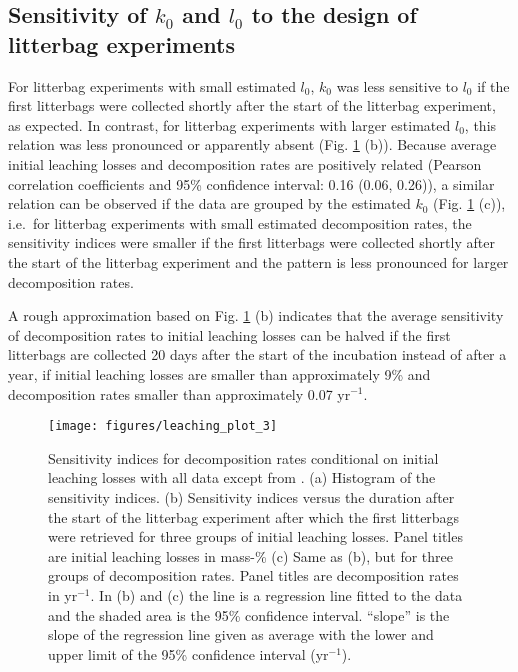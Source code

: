 \documentclass[bg, manuscript]{copernicus}
\begin{document}
\hypertarget{out-res-3}{%
\subsection{\texorpdfstring{Sensitivity of \(k_0\) and \(l_0\) to the design of litterbag experiments}{Sensitivity of k\_0 and l\_0 to the design of litterbag experiments}}\label{out-res-3}}

For litterbag experiments with small estimated \(l_0\), \(k_0\) was less sensitive to \(l_0\) if the first litterbags were collected shortly after the start of the litterbag experiment, as expected. In contrast, for litterbag experiments with larger estimated \(l_0\), this relation was less pronounced or apparently absent (Fig. \ref{fig:out-sdm-ua1-p1-p2} (b)). Because average initial leaching losses and decomposition rates are positively related (Pearson correlation coefficients and 95\% confidence interval: 0.16 (0.06, 0.26)), a similar relation can be observed if the data are grouped by the estimated \(k_0\) (Fig. \ref{fig:out-sdm-ua1-p1-p2} (c)), i.e.~for litterbag experiments with small estimated decomposition rates, the sensitivity indices were smaller if the first litterbags were collected shortly after the start of the litterbag experiment and the pattern is less pronounced for larger decomposition rates.

A rough approximation based on Fig. \ref{fig:out-sdm-ua1-p1-p2} (b) indicates that the average sensitivity of decomposition rates to initial leaching losses can be halved if the first litterbags are collected 20 days after the start of the incubation instead of after a year, if initial leaching losses are smaller than approximately 9\% and decomposition rates smaller than approximately 0.07 yr\(^{-1}\).



\begin{figure}[H]

{\centering \texttt{[image: figures/leaching\_plot\_3]} 

}

\caption{Sensitivity indices for decomposition rates conditional on initial leaching losses with all data except from \citet{Bengtsson.2017}. (a) Histogram of the sensitivity indices. (b) Sensitivity indices versus the duration after the start of the litterbag experiment after which the first litterbags were retrieved for three groups of initial leaching losses. Panel titles are initial leaching losses in mass-\% (c) Same as (b), but for three groups of decomposition rates. Panel titles are decomposition rates in yr\(^{-1}\). In (b) and (c) the line is a regression line fitted to the data and the shaded area is the 95\% confidence interval. ``slope'' is the slope of the regression line given as average with the lower and upper limit of the 95\% confidence interval (yr\(^{-1}\)).}\label{fig:out-sdm-ua1-p1-p2}
\end{figure}
\end{document}

